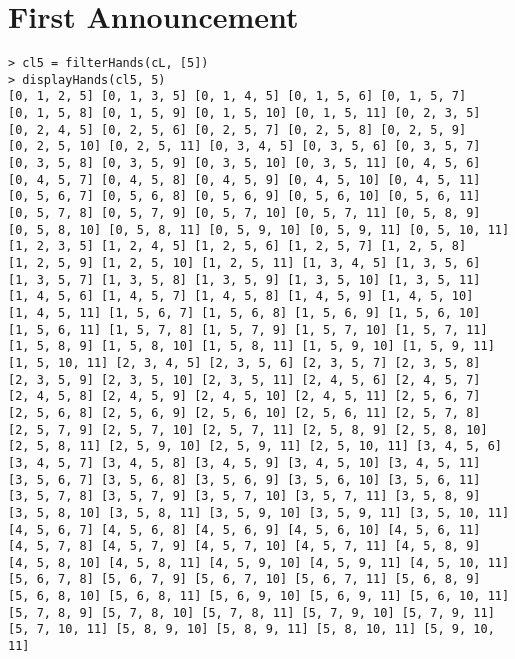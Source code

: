 \section{First Announcement}

\begin{verbatim}
> cl5 = filterHands(cL, [5])
> displayHands(cl5, 5)
[0, 1, 2, 5] [0, 1, 3, 5] [0, 1, 4, 5] [0, 1, 5, 6] [0, 1, 5, 7]
[0, 1, 5, 8] [0, 1, 5, 9] [0, 1, 5, 10] [0, 1, 5, 11] [0, 2, 3, 5]
[0, 2, 4, 5] [0, 2, 5, 6] [0, 2, 5, 7] [0, 2, 5, 8] [0, 2, 5, 9]
[0, 2, 5, 10] [0, 2, 5, 11] [0, 3, 4, 5] [0, 3, 5, 6] [0, 3, 5, 7]
[0, 3, 5, 8] [0, 3, 5, 9] [0, 3, 5, 10] [0, 3, 5, 11] [0, 4, 5, 6]
[0, 4, 5, 7] [0, 4, 5, 8] [0, 4, 5, 9] [0, 4, 5, 10] [0, 4, 5, 11]
[0, 5, 6, 7] [0, 5, 6, 8] [0, 5, 6, 9] [0, 5, 6, 10] [0, 5, 6, 11]
[0, 5, 7, 8] [0, 5, 7, 9] [0, 5, 7, 10] [0, 5, 7, 11] [0, 5, 8, 9]
[0, 5, 8, 10] [0, 5, 8, 11] [0, 5, 9, 10] [0, 5, 9, 11] [0, 5, 10, 11]
[1, 2, 3, 5] [1, 2, 4, 5] [1, 2, 5, 6] [1, 2, 5, 7] [1, 2, 5, 8]
[1, 2, 5, 9] [1, 2, 5, 10] [1, 2, 5, 11] [1, 3, 4, 5] [1, 3, 5, 6]
[1, 3, 5, 7] [1, 3, 5, 8] [1, 3, 5, 9] [1, 3, 5, 10] [1, 3, 5, 11]
[1, 4, 5, 6] [1, 4, 5, 7] [1, 4, 5, 8] [1, 4, 5, 9] [1, 4, 5, 10]
[1, 4, 5, 11] [1, 5, 6, 7] [1, 5, 6, 8] [1, 5, 6, 9] [1, 5, 6, 10]
[1, 5, 6, 11] [1, 5, 7, 8] [1, 5, 7, 9] [1, 5, 7, 10] [1, 5, 7, 11]
[1, 5, 8, 9] [1, 5, 8, 10] [1, 5, 8, 11] [1, 5, 9, 10] [1, 5, 9, 11]
[1, 5, 10, 11] [2, 3, 4, 5] [2, 3, 5, 6] [2, 3, 5, 7] [2, 3, 5, 8]
[2, 3, 5, 9] [2, 3, 5, 10] [2, 3, 5, 11] [2, 4, 5, 6] [2, 4, 5, 7]
[2, 4, 5, 8] [2, 4, 5, 9] [2, 4, 5, 10] [2, 4, 5, 11] [2, 5, 6, 7]
[2, 5, 6, 8] [2, 5, 6, 9] [2, 5, 6, 10] [2, 5, 6, 11] [2, 5, 7, 8]
[2, 5, 7, 9] [2, 5, 7, 10] [2, 5, 7, 11] [2, 5, 8, 9] [2, 5, 8, 10]
[2, 5, 8, 11] [2, 5, 9, 10] [2, 5, 9, 11] [2, 5, 10, 11] [3, 4, 5, 6]
[3, 4, 5, 7] [3, 4, 5, 8] [3, 4, 5, 9] [3, 4, 5, 10] [3, 4, 5, 11]
[3, 5, 6, 7] [3, 5, 6, 8] [3, 5, 6, 9] [3, 5, 6, 10] [3, 5, 6, 11]
[3, 5, 7, 8] [3, 5, 7, 9] [3, 5, 7, 10] [3, 5, 7, 11] [3, 5, 8, 9]
[3, 5, 8, 10] [3, 5, 8, 11] [3, 5, 9, 10] [3, 5, 9, 11] [3, 5, 10, 11]
[4, 5, 6, 7] [4, 5, 6, 8] [4, 5, 6, 9] [4, 5, 6, 10] [4, 5, 6, 11]
[4, 5, 7, 8] [4, 5, 7, 9] [4, 5, 7, 10] [4, 5, 7, 11] [4, 5, 8, 9]
[4, 5, 8, 10] [4, 5, 8, 11] [4, 5, 9, 10] [4, 5, 9, 11] [4, 5, 10, 11]
[5, 6, 7, 8] [5, 6, 7, 9] [5, 6, 7, 10] [5, 6, 7, 11] [5, 6, 8, 9]
[5, 6, 8, 10] [5, 6, 8, 11] [5, 6, 9, 10] [5, 6, 9, 11] [5, 6, 10, 11]
[5, 7, 8, 9] [5, 7, 8, 10] [5, 7, 8, 11] [5, 7, 9, 10] [5, 7, 9, 11]
[5, 7, 10, 11] [5, 8, 9, 10] [5, 8, 9, 11] [5, 8, 10, 11] [5, 9, 10, 11]

\end{verbatim}


